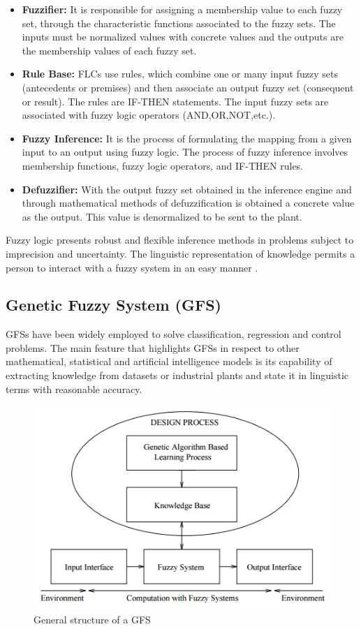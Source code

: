 \documentclass{sig-alternate-05-2015}
\begin{document}
\begin{itemize}
\item \textbf{Fuzzifier:} It is responsible for assigning a membership value to each fuzzy set, through the characteristic functions associated to the fuzzy sets. The inputs must be normalized values with concrete values and the outputs are the membership values of each fuzzy set.
\item \textbf{Rule Base:} FLCs use rules, which combine one or many input fuzzy sets (antecedents or premises) and then associate an output fuzzy set (consequent or result). The rules are IF-THEN statements. The input fuzzy sets are associated with fuzzy logic operators (AND,OR,NOT,etc.).
\item \textbf{Fuzzy Inference:} It is the process of formulating the mapping from a given input to an output using fuzzy logic. The process of fuzzy inference involves membership functions, fuzzy logic operators, and IF-THEN rules.
\item \textbf{Defuzzifier:} With the output fuzzy set obtained in the inference engine and through mathematical methods of defuzzification is obtained a concrete value as the output. This value is denormalized to be sent to the plant.
\end{itemize}

Fuzzy logic presents robust and flexible inference methods in problems subject to imprecision and uncertainty. The linguistic representation of knowledge permits a person to interact with a fuzzy system in an easy manner \cite{pawar:fuzzy}.

\subsection{Genetic Fuzzy System (GFS)}

GFSs have been widely employed to solve classification, regression and control problems. The main feature that highlights GFSs in respect to other mathematical, statistical and artificial intelligence models is its capability of extracting knowledge from datasets or industrial plants and state it in linguistic terms with reasonable accuracy\cite{koshiyama:gfs}.

\begin{figure}[h]
\centering
\includegraphics [scale=0.4]{hybridsys}
\caption{General structure of a GFS}
\end{figure}
\end{document}
